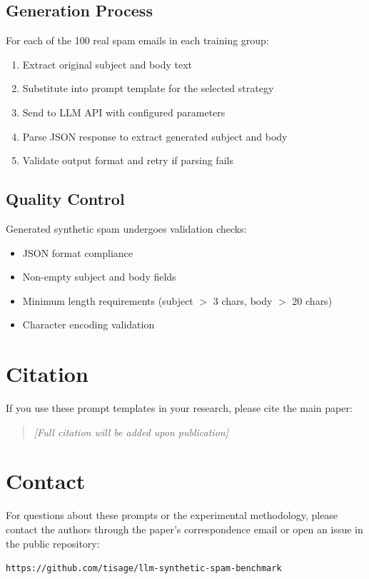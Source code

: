 \documentclass[11pt]{article}
\begin{document}
\subsection*{Generation Process}

For each of the 100 real spam emails in each training group:
\begin{enumerate}
    \item Extract original subject and body text
    \item Substitute into prompt template for the selected strategy
    \item Send to LLM API with configured parameters
    \item Parse JSON response to extract generated subject and body
    \item Validate output format and retry if parsing fails
\end{enumerate}

\subsection*{Quality Control}

Generated synthetic spam undergoes validation checks:
\begin{itemize}
    \item JSON format compliance
    \item Non-empty subject and body fields
    \item Minimum length requirements (subject $>$ 3 chars, body $>$ 20 chars)
    \item Character encoding validation
\end{itemize}

\section*{Citation}

If you use these prompt templates in your research, please cite the main paper:

\begin{quote}
\textit{[Full citation will be added upon publication]}
\end{quote}

\section*{Contact}

For questions about these prompts or the experimental methodology, please contact the authors through the paper's correspondence email or open an issue in the public repository:

\texttt{https://github.com/tisage/llm-synthetic-spam-benchmark}
\end{document}
